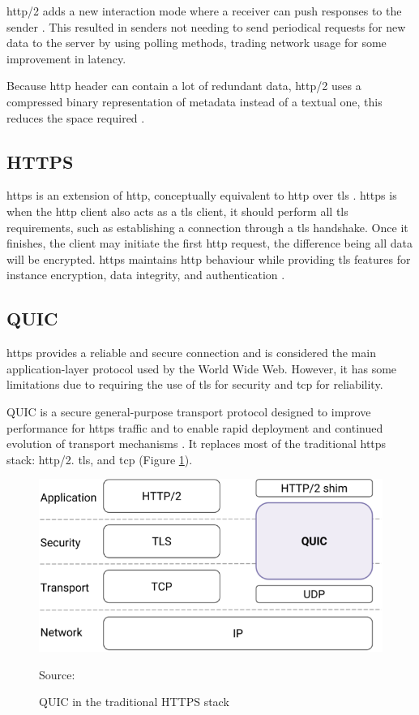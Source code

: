 \gls{http}/2 adds a new interaction mode where a receiver can push responses to the sender \cite{rfc7540}. This resulted in senders not needing to send periodical requests for new data to the server by using polling methods, trading network usage for some improvement in latency.

Because \gls{http} header can contain a lot of redundant data, \gls{http}/2 uses a compressed binary representation of metadata instead of a textual one, this reduces the space required \cite{rfc7540}.

\subsection{HTTPS}

\gls{https} is an extension of \gls{http}, conceptually equivalent to \gls{http} over \gls{tls} \cite{rfc2818}. \gls{https} is when the \gls{http} client also acts as a \gls{tls} client, it should perform all \gls{tls} requirements, such as establishing a connection through a \gls{tls} handshake. Once it finishes, the client may initiate the first \gls{http} request, the difference being all data will be encrypted. \gls{https} maintains \gls{http} behaviour while providing \gls{tls} features for instance encryption, data integrity, and authentication \cite{rfc2818}.

\subsection{QUIC}

\gls{https} provides a reliable and secure connection and is considered the main application-layer protocol used by the World Wide Web. However, it has some limitations due to requiring the use of \gls{tls} for security and \gls{tcp} for reliability.

QUIC is a secure general-purpose transport protocol designed to improve performance for \gls{https} traffic and to enable rapid deployment and continued evolution of transport mechanisms \cite{quic_protocol}. It replaces most of the traditional \gls{https} stack: \gls{http}/2. \gls{tls}, and \gls{tcp} (Figure \ref{figure:quic_http2_layers}).

\begin{figure}[ht]
    \centering
    \includegraphics[width=\linewidth]{figures/Introduction.png}
    \caption{QUIC in the traditional HTTPS stack}
    {Source: \cite{quic_protocol}}
    \label{figure:quic_http2_layers}
\end{figure}

